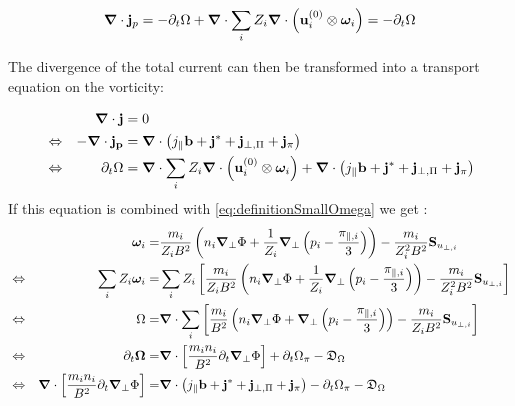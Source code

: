  \begin{equation}
 	\grad\cdot\mathbf{j}_p = -\partial_t\Omega + \grad\cdot\sum_{i}Z_i\grad\cdot\left(\mathbf{u}^{(0)}_i\otimes\boldsymbol{\omega}_i\right) = - \partial_t\Omega
 \end{equation}

The divergence of the total current can then be transformed into a transport equation on the vorticity:

 \begin{align}
 	&& \grad\cdot\mathbf{j} &= 0 \nonumber \\
 	&\Leftrightarrow& -\grad\cdot\mathbf{j_p} &= \grad\cdot\left(j_\parallel\mathbf{b} + \mathbf{j}^* + \mathbf{j}_{\perp,\Pi} + \mathbf{j}_{\pi} \right) \nonumber \\
 	&\Leftrightarrow& \partial_t\Omega &= \grad\cdot\sum_{i}Z_i\grad\cdot\left(\mathbf{u}^{(0)}_i\otimes\boldsymbol{\omega}_i\right) +\grad\cdot\left(j_\parallel\mathbf{b} + \mathbf{j}^* + \mathbf{j}_{\perp,\Pi} + \mathbf{j}_{\pi} \right)
 	\label{eq:TransportEquationVorticity}
 \end{align}
If this equation is combined with \autoref{eq:definitionSmallOmega} we get :
 \begin{align}
 	&& \boldsymbol{\omega}_i =& \frac{m_i}{Z_iB^2}\left(n_i\grad_\perp\Phi + \frac{1}{Z_i}\grad_{\perp}\left(p_i-\frac{\pi_{\parallel,i}}{3}\right)\right) - \frac{m_i}{Z_i^2B^2}\mathbf{S}_{u_{\perp,i}} \nonumber\\
	&\Leftrightarrow& \sum_{i}Z_i\boldsymbol{\omega}_i =& \sum_{i}Z_i\left[\frac{m_i}{Z_i B^2}\left(n_i\grad_\perp\Phi + \frac{1}{Z_i}\grad_{\perp}\left(p_i-\frac{\pi_{\parallel,i}}{3}\right)\right) - \frac{m_i}{Z_i^2B^2}\mathbf{S}_{u_{\perp,i}}\right] \nonumber\\
	&\Leftrightarrow& \Omega =& \grad\cdot\sum_{i}\left[\frac{m_i}{ B^2}\left(n_i\grad_\perp\Phi + \grad_{\perp}\left(p_i-\frac{\pi_{\parallel,i}}{3}\right)\right) - \frac{m_i}{Z_i B^2}\mathbf{S}_{u_{\perp,i}}\right] \nonumber \\
	&\Leftrightarrow& \partial_t\mathbf{\Omega} =& \grad\cdot\left[\frac{m_i n_i}{ B^2}\partial_t\grad_\perp\Phi\right] + \partial_t \Omega_\pi - \mathfrak{D}_\Omega \nonumber \\
	&\Leftrightarrow& \grad\cdot\left[\frac{m_i n_i}{ B^2}\partial_t\grad_\perp\Phi\right]  =&  \grad\cdot\left(j_\parallel\mathbf{b} + \mathbf{j}^* + \mathbf{j}_{\perp,\Pi} + \mathbf{j}_{\pi}\right) - \partial_t \Omega_\pi - \mathfrak{D}_\Omega \label{eq:FirstFormVorticityEquation}
 \end{align}
 
